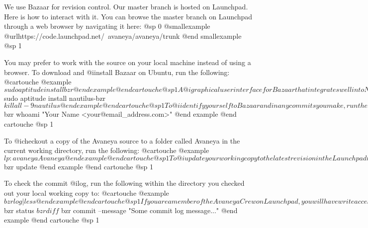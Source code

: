 We use Bazaar for revision control. Our master branch is hosted on Launchpad. Here is how to interact with it. You can browse the master branch on Launchpad through a web browser by navigating it here:
@sp 0
@smallexample
@url{https://code.launchpad.net/~avaneya/avaneya/trunk}
@end smallexample
@sp 1

You may prefer to work with the source on your local machine instead of using a browser. To download and @i{install} Bazaar on Ubuntu, run the following:
@cartouche
@example
$ sudo aptitude install bzr 
@end example
@end cartouche
@sp 1

A @i{graphical user interface} for Bazaar that integrates well into Nautilus is available on Ubuntu. If you would like to use it, run the following command to download, install, and restart Nautilus to make it available:
@cartouche
@example
$ sudo aptitude install nautilus-bzr
$ killall -9 nautilus
@end example
@end cartouche
@sp 1

To @i{identify} yourself to Bazaar and in any commits you make, run the following:
@cartouche
@example
$ bzr whoami "Your Name <your@email_address.com>"
@end example
@end cartouche
@sp 1

To @i{checkout} a copy of the Avaneya source to a folder called Avaneya in the current working directory, run the following:
@cartouche
@example
$ lp:avaneya Avaneya
@end example
@end cartouche
@sp 1

To @i{update} your working copy to the latest revision in the Launchpad master branch, run the following within the directory you checked out your local working copy to:
@cartouche
@example
$ bzr update
@end example
@end cartouche
@sp 1

To check the commit @i{log}, run the following within the directory you checked out your local working copy to:
@cartouche
@example
$ bzr log | less
@end example
@end cartouche
@sp 1

If you are a member of the Avaneya Crew on Launchpad, you will have write access to the repository which is necessary to commit to the master branch. After making your changes, run the following within the directory you checked out your local working copy to see what files you have changed (@i{status}), what changed inside of them (@i{diff}), and to finally upload (@i{commit}) your changes to the master branch:
@cartouche
@example
$ bzr status
$ bzr diff
$ bzr commit --message "Some commit log message..."
@end example
@end cartouche
@sp 1

